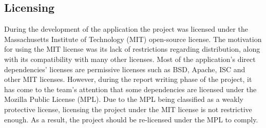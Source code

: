 \subsection{Licensing}
During the development of the application the project was licensed under the Massachusetts Institute of Technology (MIT) open-source license. The motivation for using the MIT license was its lack of restrictions regarding distribution, along with its compatibility with many other licenses. Most of the application’s direct dependencies’ licenses are permissive licenses such as BSD, Apache, ISC and other MIT licenses. However, during the report writing phase of the project, it has come to the team’s attention that some dependencies are licensed under the Mozilla Public License (MPL). Due to the MPL being classified as a weakly protective license, licensing the project under the MIT license is not restrictive enough. As a result, the project should be re-licensed under the MPL to comply.
